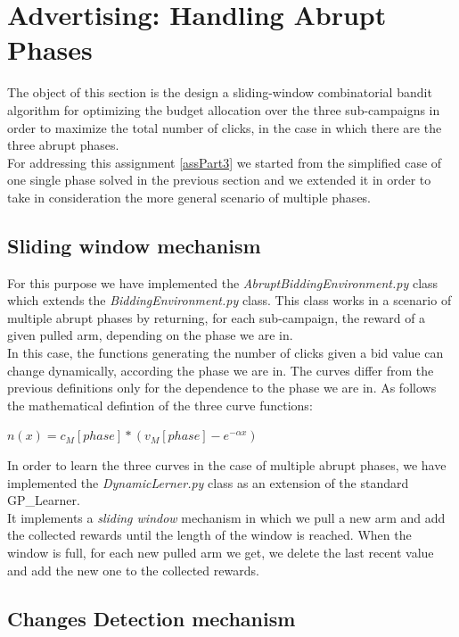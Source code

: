 \chapter{Advertising: Handling Abrupt Phases}

The object of this section is the design a sliding-window combinatorial bandit algorithm for optimizing the budget allocation over the three sub-campaigns in order to maximize the total number of clicks, in the case in which there are the three abrupt phases.\\
For addressing this assignment \ref{assPart3} we started from the simplified case of one single phase solved in the previous section and we extended it in order to take in consideration the more general scenario of multiple phases.\\

\section{Sliding window mechanism}
For this purpose we have implemented the \textit{AbruptBiddingEnvironment.py} class which extends the \textit{BiddingEnvironment.py} class. This class works in a scenario of multiple abrupt phases by returning, for each sub-campaign, the reward of a given pulled arm, depending on the phase we are in.\\

In this case, the functions generating  the number of clicks given a bid value can change dynamically, according the phase we are in.
The curves differ from the previous definitions only for the dependence to the phase we are in. As follows the mathematical defintion of the three curve functions:
\begin{center}
	$n(x) = c_{M}[phase] * (v_{M}[phase] - e^{-\alpha x})$
\end{center}

In order to learn the three curves in the case of multiple abrupt phases, we have implemented the \textit{DynamicLerner.py} class as an extension of the standard GP\_Learner.\\
It implements a \textit{sliding window} mechanism in which we pull a new arm and add the collected rewards until the length of the window is reached. When the window is full, for each new pulled arm we get, we delete the last recent value and add the new one to the collected rewards.

\section{Changes Detection mechanism}

